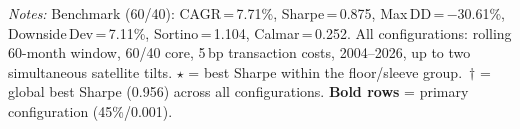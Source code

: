 \documentclass[12pt, a4paper]{article}
\begin{document}
\begin{minipage}{0.95\linewidth}
\vspace{4pt}\footnotesize
\textit{Notes:} Benchmark (60/40): CAGR\,=\,7.71\%, Sharpe\,=\,0.875, Max\,DD\,=\,$-$30.61\%, Downside\,Dev\,=\,7.11\%, Sortino\,=\,1.104, Calmar\,=\,0.252.
All configurations: rolling 60-month window, 60/40 core, 5\,bp transaction costs, 2004--2026, up to two simultaneous satellite tilts.
$\star$ = best Sharpe within the floor/sleeve group.\ $\dagger$ = global best Sharpe (0.956) across all configurations.
\textbf{Bold rows} = primary configuration (45\%/0.001).
\end{minipage}
\end{document}

